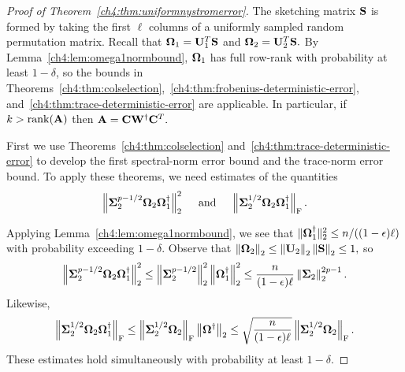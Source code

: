 \begin{proof}[Proof of Theorem~\ref{ch4:thm:uniformnystromerror}]
The sketching matrix
$\mathbf{S}$ is formed by taking the first $\ell$ columns of a uniformly sampled
random permutation matrix. Recall that $\mathbf{\Omega}_1 = \mathbf{U}_1^T
\mathbf{S}$ and $\mathbf{\Omega}_2 = \mathbf{U}_2^T \mathbf{S}.$ By Lemma~\ref{ch4:lem:omega1normbound}, 
$\mathbf{\Omega}_1$ has full row-rank with probability
at least $1-\delta$, so the bounds in Theorems~\ref{ch4:thm:colselection},~\ref{ch4:thm:frobenius-deterministic-error},
 and~\ref{ch4:thm:trace-deterministic-error} are
applicable. In particular, if $k > \mathrm{rank}(\mathbf{A})$ then $\mathbf{A} =
\mathbf{C}\mathbf{W}^\dagger \mathbf{C}^T.$

First we use Theorems~\ref{ch4:thm:colselection} and~\ref{ch4:thm:trace-deterministic-error} 
to develop the first spectral-norm error bound and the trace-norm error bound. 
To apply these theorems, we need estimates of the quantities
\[
 \left\|\mathbf{\Sigma}_2^{p-1/2} \mathbf{\Omega}_2 \mathbf{\Omega}_1^\dagger\right\|_2^2 \quad 
 \text{ and } \quad \left\|\mathbf{\Sigma}_2^{1/2} \mathbf{\Omega}_2 \mathbf{\Omega}_1^\dagger\right\|_\mathrm{F}.
\]

Applying Lemma~\ref{ch4:lem:omega1normbound}, we see that
$\|\mathbf{\Omega}_1^\dagger\|_2^2 \leq n/((1-\epsilon) \ell)$ with probability
 exceeding $1-\delta.$ 
Observe that $\left\|\mathbf{\Omega}_2\right\|_2 \leq \left\|\mathbf{U}_2\right\|_2\left\|\mathbf{S}\right\|_2 \leq 1,$ so
\begin{equation}
 \left\|\mathbf{\Sigma}_2^{p-1/2} \mathbf{\Omega}_2 \mathbf{\Omega}_1^\dagger\right\|_2^2 \leq \left\|\mathbf{\Sigma}_2^{p-1/2}\right\|_2^2 
      \left\|\mathbf{\Omega}_1^\dagger\right\|_2^2 \leq \frac{n}{(1-\epsilon)\ell} \left\|\mathbf{\Sigma}_2\right\|_2^{2p-1}.
  \label{ch4:eqn:nystrom-power-term-bound}
\end{equation}
 Likewise,
\begin{equation}
 \left\|\mathbf{\Sigma}_2^{1/2} \mathbf{\Omega}_2 \mathbf{\Omega}_1^\dagger\right\|_\mathrm{F} \leq 
      \left\|\mathbf{\Sigma}_2^{1/2} \mathbf{\Omega}_2\right\|_\mathrm{F} \left\|\mathbf{\Omega}^\dagger\right\|_2 
  \leq \sqrt{\frac{n}{(1-\epsilon) \ell}} \left\|\mathbf{\Sigma}_2^{1/2} \mathbf{\Omega}_2\right\|_\mathrm{F}
 \label{ch4:eqn:uniform-term-bound}.
\end{equation}
These estimates hold simultaneously with probability at least $1 - \delta.$


\end{proof}
